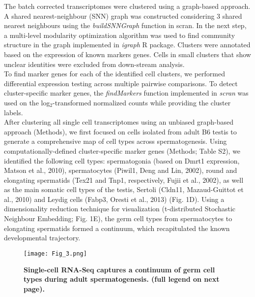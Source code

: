 The batch corrected transcriptomes were clustered using a graph-based approach. A shared nearest-neighbour (SNN) graph \citep{Xu2015} was constructed considering 3 shared nearest neighbours using the \emph{buildSNNGraph} function in scran. In the next step, a multi-level modularity optimization algorithm was used to find community structure in the graph \citep{Blondel2008} implemented in \emph{igraph} R package. Clusters were annotated based on the expression of known markers genes. Cells in small clusters that show unclear identities were excluded from down-stream analysis.\\

To find marker genes for each of the identified cell clusters, we performed differential expression testing across multiple pairwise comparisons. To detect cluster-specific marker genes, the \emph{findMarkers} function implemented in \emph{scran} was used on the log$_2$-transformed normalized counts while providing the cluster labels. \\

After clustering all single cell transcriptomes using an unbiased graph-based approach (Methods), we first focused on cells isolated from adult B6 testis to generate a comprehensive map of cell types across spermatogenesis. Using computationally-defined cluster-specific marker genes (Methods; Table S2), we identified the following cell types: spermatogonia (based on Dmrt1 expression, Matson et al., 2010), spermatocytes (Piwil1, Deng and Lin, 2002), round and elongating spermatids (Tex21 and Tnp1, respectively, Fujii et al., 2002), as well as the main somatic cell types of the testis, Sertoli (Cldn11, Mazaud-Guittot et al., 2010) and Leydig cells (Fabp3, Oresti et al., 2013) (Fig. 1D). Using a dimensionality reduction technique for visualization (t-distributed Stochastic Neighbour Embedding; Fig. 1E), the germ cell types from spermatocytes to elongating spermatids formed a continuum, which recapitulated the known developmental trajectory.

\begin{figure}[!h]
\centering
\texttt{[image: Fig\_3.png]}
\caption[Droplet based scRNAseq of mouse spermatogenesis]{\textbf{Single-cell RNA-Seq captures a continuum of germ cell types during adult spermatogenesis. (full legend on next page).}\\}
\label{fig2:cell_types}
\end{figure}



